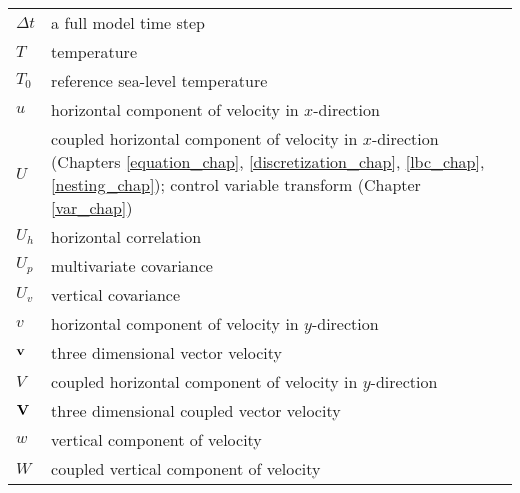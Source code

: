 \begin{tabular}{ l p{5.5in} }
$\Delta t$     & a full model time step \\
$T$            & temperature \\
$T_0$          & reference sea-level temperature \\
$u$            & horizontal component of velocity in $x$-direction \\
$U$            & coupled horizontal component of velocity in $x$-direction (Chapters \ref{equation_chap}, \ref{discretization_chap}, \ref{lbc_chap}, \ref{nesting_chap}); control variable transform (Chapter \ref{var_chap}) \\
$U_h$          & horizontal correlation \\
$U_p$          & multivariate covariance \\
$U_v$          & vertical covariance \\
$v$            & horizontal component of velocity in $y$-direction \\
$\bf v$        & three dimensional vector velocity \\
$V$            & coupled horizontal component of velocity in $y$-direction \\
$\bf V$        & three dimensional coupled vector velocity \\
$w$            & vertical component of velocity \\
$W$            & coupled vertical component of velocity \\

\end{tabular}

